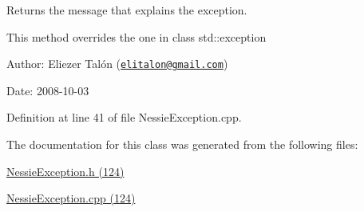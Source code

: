 Returns the message that explains the exception. 

This method overrides the one in class std::exception

\begin{Desc}
\item[Author:]Eliezer Talón (\href{mailto:elitalon@gmail.com}{\tt elitalon@gmail.com}) \end{Desc}
\begin{Desc}
\item[Date:]2008-10-03 \end{Desc}


Definition at line 41 of file NessieException.cpp.

The documentation for this class was generated from the following files:\begin{CompactItemize}
\item 
\hyperlink{_nessie_exception_8h}{NessieException.h (124)}\item 
\hyperlink{_nessie_exception_8cpp}{NessieException.cpp (124)}\end{CompactItemize}
